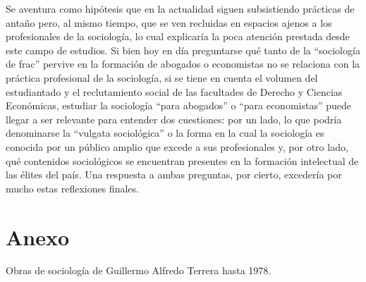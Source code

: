 Se aventura como hipótesis que en la actualidad siguen subsistiendo prácticas de antaño pero, al mismo tiempo, que se ven recluidas en espacios ajenos a los profesionales de la sociología, lo cual explicaría la poca atención prestada desde este campo de estudios. Si bien hoy en día preguntarse qué tanto de la \enquote{sociología de frac} pervive en la formación de abogados o economistas no se relaciona con la práctica profesional de la sociología, si se tiene en cuenta el volumen del estudiantado y el reclutamiento social de las facultades de Derecho y Ciencias Económicas, estudiar la sociología \enquote{para abogados} o \enquote{para economistas} puede llegar a ser relevante para entender dos cuestiones: por un lado, lo que podría denominarse la \enquote{vulgata sociológica} o la forma en la cual la sociología es conocida por un público amplio que excede a sus profesionales y, por otro lado, qué contenidos sociológicos se encuentran presentes en la formación intelectual de las élites del país. Una respuesta a ambas preguntas, por cierto, excedería por mucho estas reflexiones finales.

\section*{Anexo}

Obras de sociología de Guillermo Alfredo Terrera hasta 1978.

